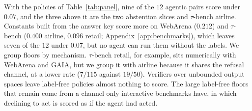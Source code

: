 \documentclass{article}
\theoremstyle{plain}
\theoremstyle{definition}
\begin{document}
With the policies of Table~\ref{tab:panel}, nine of the $12$ agentic pairs score under $0.07$, and the three above it are the two abstention slices and $\tau$-bench airline. Constants built from the answer key score more on WebArena ($0.212$) and $\tau$-bench ($0.400$ airline, $0.096$ retail; Appendix~\ref{app:benchmarks}), which leaves seven of the $12$ under $0.07$, but no agent can run them without the labels. We group floors by mechanism. $\tau$-bench retail, for example, sits numerically with WebArena and GAIA, but we group it with airline because it shares the refusal channel, at a lower rate ($7/115$ against $19/50$). Verifiers over unbounded output spaces leave label-free policies almost nothing to score. The large label-free floors that remain come from a channel only interactive benchmarks have, in which declining to act is scored as if the agent had acted.
\end{document}

